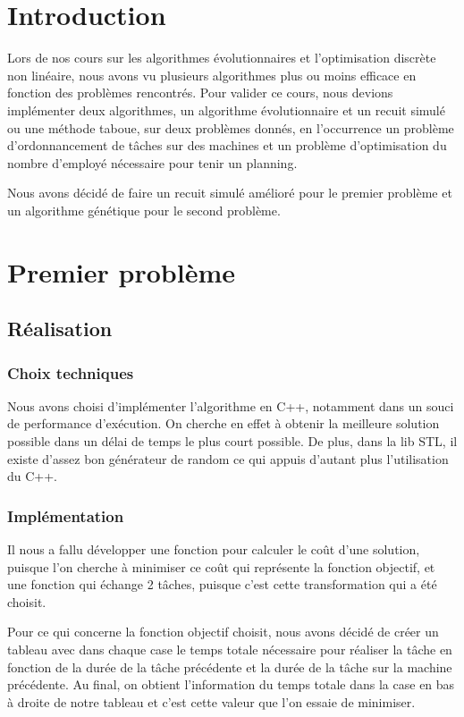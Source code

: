 \documentclass{report}
\begin{document}
\tableofcontents

\chapter{Introduction}
\minitoc
Lors de nos cours sur les algorithmes évolutionnaires et l'optimisation discrète non linéaire, nous avons vu plusieurs algorithmes plus ou moins efficace en fonction des problèmes rencontrés. Pour valider ce cours, nous devions implémenter deux algorithmes, un algorithme évolutionnaire et un recuit simulé ou une méthode taboue, sur deux problèmes donnés, en l'occurrence un problème d'ordonnancement de tâches sur des machines et un problème d'optimisation du nombre d'employé nécessaire pour tenir un planning.

Nous avons décidé de faire un recuit simulé amélioré pour le premier problème et un algorithme génétique pour le second problème.
\newpage

\chapter{Premier problème}
\minitoc
\section{Réalisation}
\subsection{Choix techniques}
Nous avons choisi d'implémenter l'algorithme en C++, notamment dans un souci de performance d’exécution. On cherche en effet à obtenir la meilleure solution possible dans un délai de temps le plus court possible. De plus, dans la lib STL, il existe d'assez bon générateur de random ce qui appuis d'autant plus l'utilisation du C++.

\subsection{Implémentation}
Il nous a fallu développer une fonction pour calculer le coût d'une solution, puisque l'on cherche à minimiser ce coût qui représente la fonction objectif, et une fonction qui échange 2 tâches, puisque c'est cette transformation qui a été choisit.

Pour ce qui concerne la fonction objectif choisit, nous avons décidé de créer un tableau avec dans chaque case le temps totale nécessaire pour réaliser la tâche en fonction de la durée de la tâche précédente et la durée de la tâche sur la machine précédente. Au final, on obtient l'information du temps totale dans la case en bas à droite de notre tableau et c'est cette valeur que l'on essaie de minimiser.
\end{document}
